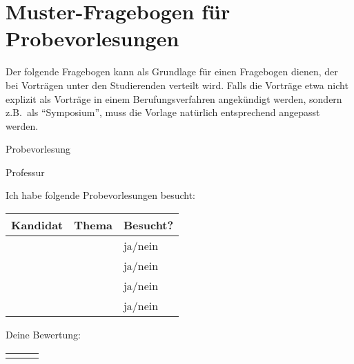 \chapter{Muster-Fragebogen für Probevorlesungen}\thispagestyle{fancy}\label{chp:fragebogen}
Der folgende Fragebogen kann als Grundlage für einen Fragebogen dienen, der bei Vorträgen unter den Studierenden verteilt wird. Falls die Vorträge etwa nicht explizit als Vorträge in einem Berufungsverfahren angekündigt werden, sondern z.B.\, als \enquote{Symposium}, muss die Vorlage natürlich entsprechend angepasst werden.

\clearpage{}

\noindent\begin{minipage}{\textwidth}
    \begin{center}
        \Large
        Probevorlesung\smallskip\par
        \large
        Professur \underline{\hspace{6cm}}
    \end{center}

    \parbox{\textwidth}{\large Ich habe folgende Probevorlesungen besucht:}\smallskip\par
    \begin{tabular}{|p{4.5cm}p{4cm}|p{1.5cm}|}
        \hline
        \rowcolor{light}
        Kandidat & Thema & Besucht? \\
        \hline
                 &       & ja/nein  \\\hline
                 &       & ja/nein  \\\hline
                 &       & ja/nein  \\\hline
                 &       & ja/nein  \\\hline
    \end{tabular}
    \bigskip

    \parbox{\textwidth}{\large Deine Bewertung:}\smallskip\par
    \begin{tabular}{|m{61mm}|m{20mm}|m{20mm}|}\hline
        \rowcolor{light}\hline


\end{tabular}
\end{minipage}
